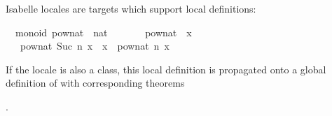 \begin{isabellebody}
\isamarkuptrue%
%
\isamarkuptrue%
%
\begin{isamarkuptext}%
Isabelle locales are targets which support local definitions:%
\end{isamarkuptext}%
\isamarkuptrue%
%
\isadelimquote
%
\endisadelimquote
%
\isatagquote
{}\isamarkupfalse%
\ {\isacharparenleft}\ monoid{\isacharparenright}\ pow{\isacharunderscore}nat\ {\isacharcolon}{\isacharcolon}\ {\isachardoublequoteopen}nat\ {\isasymRightarrow}\ {\isasymalpha}\ {\isasymRightarrow}\ {\isasymalpha}{\isachardoublequoteclose}\ \isanewline
\ \ {\isachardoublequoteopen}pow{\isacharunderscore}nat\ {}\ x\ {\isacharequal}\ {\isasymone}{\isachardoublequoteclose}\isanewline
\ \ {\isacharbar}\ {\isachardoublequoteopen}pow{\isacharunderscore}nat\ {\isacharparenleft}Suc\ n{\isacharparenright}\ x\ {\isacharequal}\ x\ {\isasymotimes}\ pow{\isacharunderscore}nat\ n\ x{\isachardoublequoteclose}%
\endisatagquote
{\isafoldquote}%
%
\isadelimquote
%
\endisadelimquote
%
\begin{isamarkuptext}%
\noindent If the locale  is also a class, this local
  definition is propagated onto a global definition of
  with corresponding theorems

  .


\end{isamarkuptext}
\end{isabellebody}
